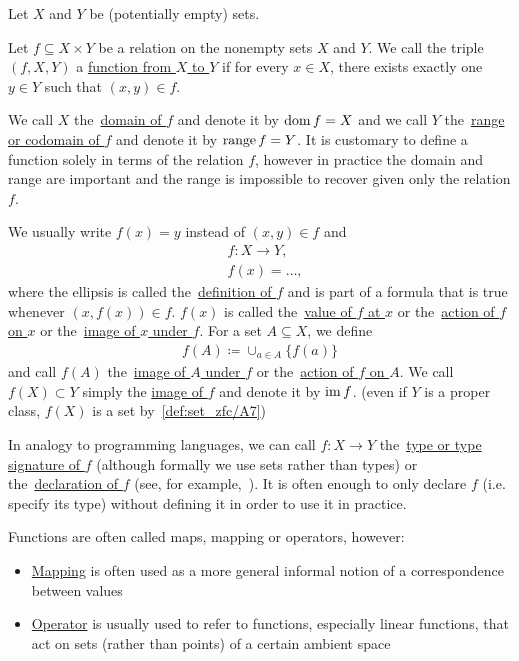 \begin{definition}\label{def:function}
  Let $X$ and $Y$ be (potentially empty) sets.

  Let $f \subseteq X \times Y$ be a relation on the nonempty sets $X$ and $Y$. We call the triple $(f, X, Y)$ a \uline{function from $X$ to $Y$} if for every $x \in X$, there exists exactly one $y \in Y$ such that $(x, y) \in f$.

  We call $X$ the~\uline{domain of $f$} and denote it by $\operatorname{dom} f = X$ and we call $Y$ the~\uline{range or codomain of $f$} and denote it by $\operatorname{range} f = Y$. It is customary to define a function solely in terms of the relation $f$, however in practice the domain and range are important and the range is impossible to recover given only the relation $f$.

  We usually write $f(x) = y$ instead of $(x, y) \in f$ and
  \begin{align*}
    &f: X \to Y, \\
    &f(x) = \ldots,
  \end{align*}
  where the ellipsis is called the~\uline{definition of $f$} and is part of a formula that is true whenever $(x, f(x)) \in f$. $f(x)$ is called the~\uline{value of $f$ at $x$} or the~\uline{action of $f$ on $x$} or the~\uline{image of $x$ under $f$}. For a set $A \subseteq X$, we define
  \begin{align*}
    f(A) \coloneqq \cup_{a \in A} \{ f(a) \}
  \end{align*}
  and call $f(A)$ the~\uline{image of $A$ under $f$} or the~\uline{action of $f$ on $A$}. We call $f(X) \subset Y$ simply the \uline{image of $f$} and denote it by $\operatorname{im} f$. (even if $Y$ is a proper class, $f(X)$ is a set by~\cref{def:set_zfc/A7})

  In analogy to programming languages, we can call $f: X \to Y$ the~\uline{type or type signature of $f$} (although formally we use sets rather than types) or the~\uline{declaration of $f$} (see, for example,~\cite[section 2.4]{Kernighan1988}). It is often enough to only declare $f$ (i.e. specify its type) without defining it in order to use it in practice.

  Functions are often called maps, mapping or operators, however:
  \begin{itemize}
    \item \uline{Mapping} is often used as a more general informal notion of a correspondence between values
    \item \uline{Operator} is usually used to refer to functions, especially linear functions, that act on sets (rather than points) of a certain ambient space
  \end{itemize}


\end{definition}
